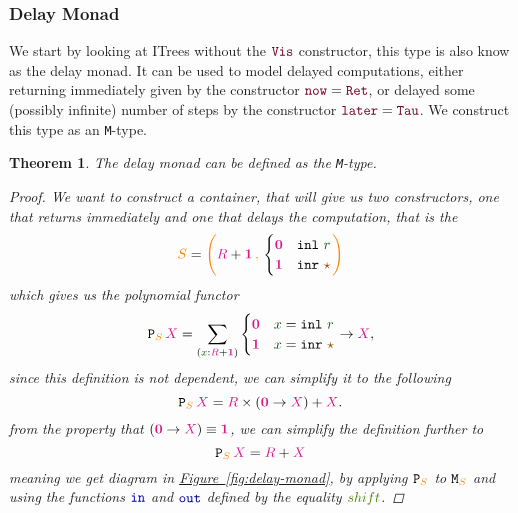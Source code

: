 \documentclass[twoside,11pt,openright]{report}
\theoremstyle{plain} %
\newtheorem{thm}{Theorem}[section]
\theoremstyle{definition}
\theoremstyle{remark}
\newcommand*{\figref}[1]{\hyperref[fig:#1]{Figure~\ref*{fig:#1}}}
\newcommand*{\term}[1]{\textcolor{green!30!black}{#1}} %
\newcommand*{\pathterm}[1]{\textcolor{green!65!red!75!black}{#1}}
\newcommand*{\type}[1]{\textcolor{magenta!90!black}{#1}}
\newcommand*{\container}[1]{\textcolor{orange}{#1}}
\newcommand*{\containerpair}[2]{\ensuremath{\colorlet{savedleftcolor}{.}\color{orange}\left(\color{savedleftcolor}#1\,\textcolor{orange}{\mathbf{,}}\,#2\color{orange}\right)\color{savedleftcolor}}}
\newcommand*{\unit}{\type{\textbf{1}}}
\newcommand*{\empt}{\type{\textbf{0}}}
\newcommand*{\constant}[1]{\textcolor{orange!60!black}{\ensuremath{\mathtt{#1}}}}
\newcommand*{\function}[1]{\textcolor{blue!60!black}{\ensuremath{\mathtt{#1}}}}
\newcommand*{\constructor}[1]{\textcolor{purple!60!black}{\ensuremath{\mathtt{#1}}}}
\newcommand*{\functor}[1]{\ensuremath{\mathbf{\mathtt{#1}}}}
\newcommand*{\unitelem}{\constant{\star}} %
\begin{document}
\subsubsection{Delay Monad}
We start by looking at ITrees without the \(\constructor{Vis}\) constructor, this type is also know as the delay monad. It can be used to model delayed computations, either returning immediately given by the constructor \(\constructor{now} = \constructor{Ret}\), or delayed some (possibly infinite) number of steps by the constructor \(\constructor{later} = \constructor{Tau}\). We construct this type as an \texttt{M}-type.
\begin{thm}
  The delay monad can be defined as the \texttt{M}-type.
  \begin{proof}
    We want to construct a container, that will give us two constructors, one that returns immediately and one that delays the computation, that is the
    \begin{equation}
      \container{S} = \containerpair{\type{R} +\unit}{\begin{cases} \empt & \mathtt{inl}~\term{r} \\ \unit & \mathtt{inr}~\unitelem \end{cases}}
    \end{equation}
    which gives us the polynomial functor
    \begin{equation}
      \functor{P}_{\container{S}}\,\type{X} = \sum_{(\term{x} : \type{R} + \unit)} \begin{cases} \empt & \term{x} = \mathtt{inl}~\term{r} \\ \unit & \term{x} = \mathtt{inr}~\unitelem \end{cases} \rightarrow \type{X},
    \end{equation}
    since this definition is not dependent, we can simplify it to the following
    \begin{equation}
      \functor{P}_{\container{S}}\,\type{X} = \type{R} \times (\empt \rightarrow \type{X}) + \type{X}.
    \end{equation}
    from the property that \((\empt \rightarrow \type{X}) \equiv \unit\), we can simplify the definition further to
    \begin{equation}
      \functor{P}_{\container{S}}\,\type{X} = \type{R} + \type{X}
    \end{equation}
    meaning we get diagram in \figref{delay-monad}, by applying \(\functor{P}_{\container{S}}\) to \(\mathtt{M}_{\container{S}}\) and using the functions \(\function{in}\) and \(\function{out}\) defined by the equality \(\pathterm{shift}\).

\end{proof}
\end{thm}
\end{document}
